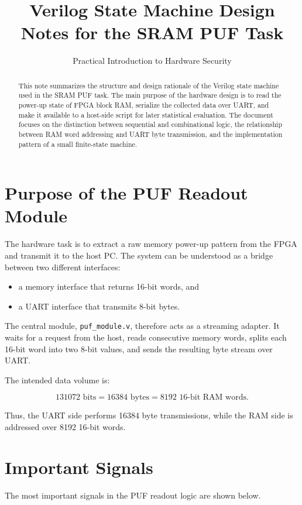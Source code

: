 \documentclass[11pt,a4paper]{article}
\title{\textbf{Verilog State Machine Design Notes for the SRAM PUF Task}}
\author{Practical Introduction to Hardware Security}
\date{}
\begin{document}
\maketitle

\begin{abstract}
This note summarizes the structure and design rationale of the Verilog state machine used in the SRAM PUF task. The main purpose of the hardware design is to read the power-up state of FPGA block RAM, serialize the collected data over UART, and make it available to a host-side script for later statistical evaluation. The document focuses on the distinction between sequential and combinational logic, the relationship between RAM word addressing and UART byte transmission, and the implementation pattern of a small finite-state machine.
\end{abstract}

\section{Purpose of the PUF Readout Module}

The hardware task is to extract a raw memory power-up pattern from the FPGA and transmit it to the host PC. The system can be understood as a bridge between two different interfaces:

\begin{itemize}
  \item a memory interface that returns 16-bit words, and
  \item a UART interface that transmits 8-bit bytes.
\end{itemize}

The central module, \texttt{puf\_module.v}, therefore acts as a streaming adapter. It waits for a request from the host, reads consecutive memory words, splits each 16-bit word into two 8-bit values, and sends the resulting byte stream over UART.

The intended data volume is:

\[
131072 \text{ bits} = 16384 \text{ bytes} = 8192 \text{ 16-bit RAM words}.
\]

Thus, the UART side performs 16384 byte transmissions, while the RAM side is addressed over 8192 16-bit words.

\section{Important Signals}

The most important signals in the PUF readout logic are shown below.
\end{document}
